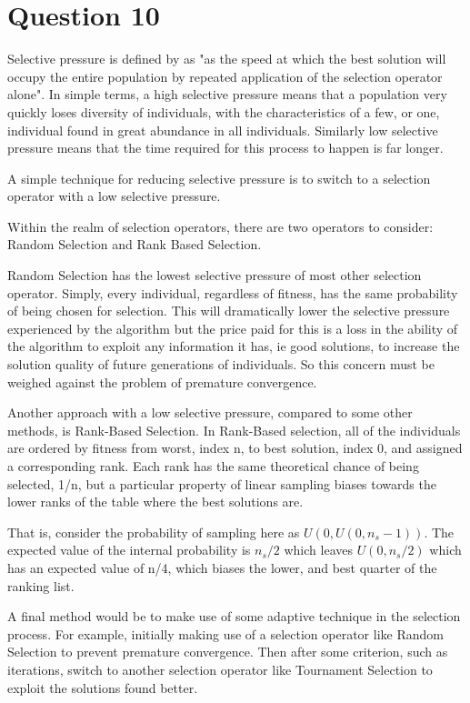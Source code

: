 \documentclass[12pt]{article}
\begin{document}
\section{Question 10}
Selective pressure is defined by \cite{back_1994} as "as the speed at which the best solution will occupy the entire population by repeated application of the selection operator alone". In simple terms, a high selective pressure means that a population very quickly loses diversity of individuals, with the characteristics of a few, or one, individual found in great abundance in all individuals. Similarly low selective pressure means that the time required for this process to happen is far longer.

A simple technique for reducing selective pressure is to switch to a selection operator with a low selective pressure.  

Within the realm of selection operators, there are two operators to consider: Random Selection and Rank Based Selection.

Random Selection has the lowest selective pressure of most other selection operator. Simply, every individual, regardless of fitness, has the same probability of being chosen for selection. This will dramatically lower the selective pressure experienced by the algorithm but the price paid for this is a loss in the ability of the algorithm to exploit any information it has, ie good solutions, to increase the solution quality of future generations of individuals. So this concern must be weighed against the problem of premature convergence.

Another approach with a low selective pressure, compared to some other methods, is Rank-Based Selection.
In Rank-Based selection, all of the individuals are ordered by fitness from worst, index n, to best solution, index 0, and assigned a corresponding rank. Each rank has the same theoretical chance of being selected, 1/n, but a particular property of linear sampling biases towards the lower ranks of the table where the best solutions are.

That is, consider the probability of sampling here as $U(0,U(0,n_s−1))$. The expected value of the internal probability is $n_s/2$ which leaves $U(0,n_s/2)$ which has an expected value of n/4, which biases the lower, and best quarter of the ranking list.

A final method would be to make use of some adaptive technique in the selection process. For example, initially making use of a selection operator like Random Selection to prevent premature convergence. Then after some criterion, such as iterations, switch to another selection operator like Tournament Selection to exploit the solutions found better.
\end{document}
